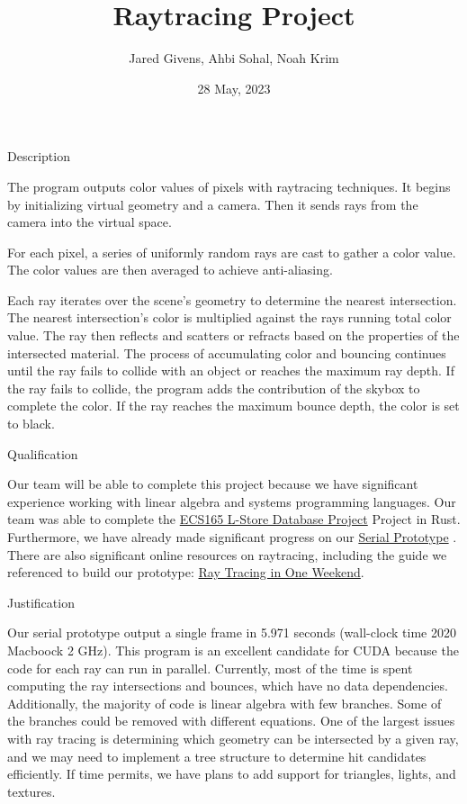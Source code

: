 \documentclass{article}
\title{Raytracing Project}
\author{Jared Givens, Ahbi Sohal, Noah Krim}
\date{28 May, 2023}
\begin{document}
\maketitle

\large
Description

\normalsize
The program outputs color values of pixels with raytracing techniques. 
It begins by initializing virtual geometry and a camera. Then it sends rays from the camera 
into the virtual space. 

For each pixel, a series of uniformly random rays are 
cast to gather a color value. The color values are then averaged to achieve anti-aliasing. 

Each ray iterates over the scene's geometry to determine the nearest 
intersection. The nearest intersection's color is multiplied against the 
rays running total color value. The ray then reflects and scatters or refracts 
based on the properties of the intersected material. The process of 
accumulating color and bouncing continues until the ray fails to collide with 
an object or reaches the maximum ray depth. If the ray fails to collide, the 
program adds the contribution of the skybox to complete the color.  
If the ray reaches the 
maximum bounce depth, the color is set to black.  

\large
Qualification

\normalsize
Our team will be able to complete this project because we have signiﬁcant experience working with linear
algebra and systems programming languages. Our team was able to complete the 
\href{https://github.com/abhiss/lstore}
{ECS165 L-Store Database Project} 
Project in Rust. Furthermore, we have already made significant progress on our 
\href{https://github.com/JaredGivens/ECS158-Raytracing}{Serial Prototype}
. There are also
signiﬁcant online resources on raytracing, including the guide we referenced to build our prototype:
\href{https://raytracing.github.io/books/RayTracingInOneWeekend.html}{Ray Tracing in One Weekend}.

\large
Justification

\normalsize
Our serial prototype output a single frame in 5.971 seconds
(wall-clock time 2020 Macboock 2 GHz). This program is an excellent 
candidate for CUDA because the code for each ray can run in parallel. 
Currently, most of the time is spent computing the ray intersections and bounces, which 
have no data dependencies. Additionally, the majority of code is linear algebra 
with few branches. Some of the branches could be removed with different equations. 
One of the largest issues with ray tracing is determining which geometry can be 
intersected by a given ray, and we may need to implement a tree structure to 
determine hit candidates efficiently. If time permits, we have plans to add 
support for triangles, lights, and textures.
\end{document}
